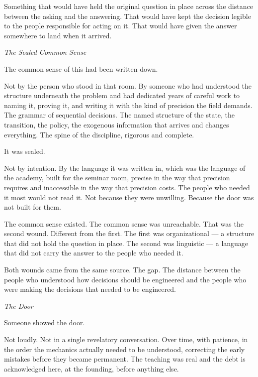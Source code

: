 Something that would have held the original question in place across the distance between the asking and the answering. That would have kept the decision legible to the people responsible for acting on it. That would have given the answer somewhere to land when it arrived.

\vspace{1.5em}
\begin{center}
  \small\itshape The Sealed Common Sense
\end{center}
\vspace{1.5em}

The common sense of this had been written down.

Not by the person who stood in that room. By someone who had understood the structure underneath the problem and had dedicated years of careful work to naming it, proving it, and writing it with the kind of precision the field demands. The grammar of sequential decisions. The named structure of the state, the transition, the policy, the exogenous information that arrives and changes everything. The spine of the discipline, rigorous and complete.

It was sealed.

Not by intention. By the language it was written in, which was the language of the academy, built for the seminar room, precise in the way that precision requires and inaccessible in the way that precision costs. The people who needed it most would not read it. Not because they were unwilling. Because the door was not built for them.

The common sense existed. The common sense was unreachable. That was the second wound. Different from the first. The first was organizational --- a structure that did not hold the question in place. The second was linguistic --- a language that did not carry the answer to the people who needed it.

Both wounds came from the same source. The gap. The distance between the people who understood how decisions should be engineered and the people who were making the decisions that needed to be engineered.

\vspace{1.5em}
\begin{center}
  \small\itshape The Door
\end{center}
\vspace{1.5em}

Someone showed the door.

Not loudly. Not in a single revelatory conversation. Over time, with patience, in the order the mechanics actually needed to be understood, correcting the early mistakes before they became permanent. The teaching was real and the debt is acknowledged here, at the founding, before anything else.

